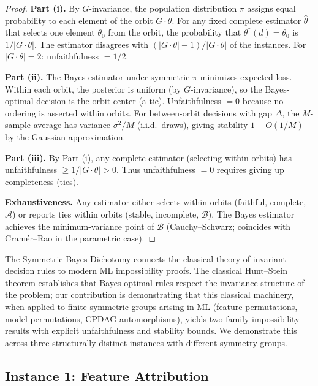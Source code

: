 \documentclass{article}
\begin{document}
\begin{proof}
\textbf{Part (i).} By $G$-invariance, the population distribution $\pi$ assigns equal probability to each element of the orbit $G \cdot \theta$. For any fixed complete estimator $\hat\theta$ that selects one element $\theta_0$ from the orbit, the probability that $\theta^*(d) = \theta_0$ is $1/|G \cdot \theta|$. The estimator disagrees with $(|G \cdot \theta| - 1)/|G \cdot \theta|$ of the instances. For $|G \cdot \theta| = 2$: unfaithfulness $= 1/2$.

\textbf{Part (ii).} The Bayes estimator under symmetric $\pi$ minimizes expected loss. Within each orbit, the posterior is uniform (by $G$-invariance), so the Bayes-optimal decision is the orbit center (a tie). Unfaithfulness $= 0$ because no ordering is asserted within orbits. For between-orbit decisions with gap $\Delta$, the $M$-sample average has variance $\sigma^2/M$ (i.i.d.\ draws), giving stability $1 - O(1/M)$ by the Gaussian approximation.

\textbf{Part (iii).} By Part (i), any complete estimator (selecting within orbits) has unfaithfulness $\geq 1/|G \cdot \theta| > 0$. Thus unfaithfulness $= 0$ requires giving up completeness (ties).

\textbf{Exhaustiveness.} Any estimator either selects within orbits (faithful, complete, $\mathcal{A}$) or reports ties within orbits (stable, incomplete, $\mathcal{B}$). The Bayes estimator achieves the minimum-variance point of $\mathcal{B}$ (Cauchy--Schwarz; coincides with Cram\'er--Rao in the parametric case).
\end{proof}

\begin{sloppypar}
The Symmetric Bayes Dichotomy connects the classical theory of invariant decision
rules \citep{lehmann2005testing,hunt1946} to modern ML impossibility proofs. The
classical Hunt--Stein theorem establishes that Bayes-optimal rules respect the
invariance structure of the problem; our contribution is demonstrating that this
classical machinery, when applied to finite symmetric groups arising in ML (feature
permutations, model permutations, CPDAG automorphisms), yields two-family
impossibility results with explicit unfaithfulness and stability bounds. We
demonstrate this across three structurally distinct instances with different
symmetry groups.
\end{sloppypar}

\subsection{Instance 1: Feature Attribution}
\end{document}

